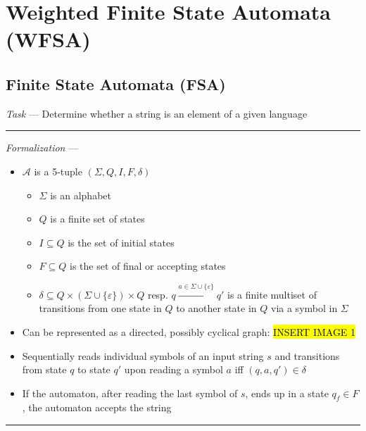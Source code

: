 \section{Weighted Finite State Automata (WFSA)}
\subsection*{Finite State Automata (FSA)}
\emph{Task} --- Determine whether a string is an element of a given language

{\color{lightgrey}\hrule height 0.001mm}

\emph{Formalization} --- 
\begin{itemize}
    \item $\mathcal{A}$ is a 5-tuple $(\Sigma, Q, I, F, \delta)$
    \begin{itemize}
        \item $\Sigma$ is an alphabet
        \item $Q$ is a finite set of states
        \item $I \subseteq Q$ is the set of initial states
        \item $F \subseteq Q$ is the set of final or accepting states
        \item $\delta \subseteq Q \times (\Sigma \cup \{\varepsilon\}) \times Q$ resp. $q \xrightarrow{a \in \Sigma \cup \{\varepsilon\}} q'$ is a finite multiset of transitions from one state in $Q$ to another state in $Q$ via a symbol in $\Sigma$ 
    \end{itemize}
    \item Can be represented as a directed, possibly cyclical graph:
    \hl{INSERT IMAGE 1}
    \item Sequentially reads individual symbols of an input string $s$ and transitions from state $q$ to state $q'$ upon reading a symbol $a$ iff $(q, a, q') \in \delta$
    \item If the automaton, after reading the last symbol of $s$, ends up in a state $q_f \in F$, the automaton accepts the string
\end{itemize}

{\color{black}\hrule height 0.001mm}

